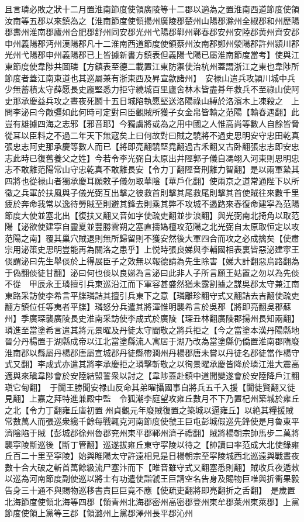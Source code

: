 且言璘必敗之狀十二月置淮南節度使領廣陵等十二郡以適為之置淮南西道節度使領汝南等五郡以來鎮為之【淮南節度使領揚州廣陵郡楚州山陽郡滁州全椒郡和州歷陽郡夀州淮南郡廬州合肥郡舒州同安郡光州弋陽郡鄿州鄿春郡安州安陸郡黄州齊安郡申州義陽郡沔州漢陽郡凡十二淮南西道節度使領蔡州汝南郡鄭州滎陽郡許州潁川郡光州弋陽郡申州義陽郡已上皆據新書方鎮表但義陽弋陽已屬淮南節度當考】使與江東節度使韋陟共圖璘【方鎮表至德二載置江東防禦使治杭州蓋謂浙江之東也韋陟所節度者蓋江南東道也其巡屬兼有浙東西及昇宣歙諸州】　安禄山遣兵攻頴川城中兵少無蓄積太守薛愿長史龐堅悉力拒守繞城百里廬舍林木皆盡朞年救兵不至祿山使阿史那承慶益兵攻之晝夜死鬭十五日城陷執愿堅送洛陽祿山縛於洛濱木上凍殺之　上問李泌曰今敵彊如此何時可定對曰臣觀賊所獲子女金帛皆輸之范陽【輸舂遇翻】此豈有雄據四海之志邪【邪音耶】今獨虜將或為之用中國之人惟高尚等數人自餘皆脅從耳以臣料之不過二年天下無寇矣上曰何故對曰賊之驍將不過史思明安守忠田乾真張忠志阿史那承慶等數人而已【將即亮翻驍堅堯翻過古禾翻又古卧翻張忠志即安忠志此時已復舊養父之姓】今若令李光弼自太原出井陘郭子儀自馮翊入河東則思明忠志不敢離范陽常山守忠乾真不敢離長安【令力丁翻陘音刑離力智翻】是以兩軍縶其四將也從禄山者獨承慶耳願敕子儀勿取華陰【華戶化翻】使兩京之道常通陛下以所徵之兵軍於扶風與子儀光弼互出擊之彼救首則擊其尾救尾則擊其首使賊往來數千里疲於奔命我常以逸待勞賊至則避其鋒去則乘其弊不攻城不遏路來春復命建寜為范陽節度大使並塞北出【復扶又翻又音如字使疏吏翻並步浪翻】與光弼南北掎角以取范陽【泌欲使建寜自靈夏並豐勝雲朔之塞直擣媯檀攻范陽之北光弼自太原取恒定以攻范陽之南】覆其巢穴賊退則無所歸留則不獲安然後大軍四合而攻之必成擒矣【使肅宗用泌策史思明豈能再為關洛之患乎】上悦時張良娣與李輔國相表裏皆惡泌建寜王倓謂泌曰先生舉倓於上得展臣子之效無以報德請為先生除害【娣大計翻惡烏路翻為于偽翻倓徒甘翻】泌曰何也倓以良娣為言泌曰此非人子所言願王姑置之勿以為先倓不從　甲辰永王璘擅引兵東巡沿江而下軍容甚盛然猶未露割據之謀吳郡太守兼江南東路采訪使李希言平牒璘詰其擅引兵東下之意【璘離珍翻守式又翻詰去吉翻使疏吏翻方鎮位任等夷者平牒】璘怒分兵遣其將渾惟明襲希言於吳郡【將即亮翻吳郡蘇州】季廣琛襲廣陵長史淮南采訪使李成式於廣陵【琛丑林翻廣陵郡揚州長知兩翻】璘進至當塗希言遣其將元景曜及丹徒太守閻敬之將兵拒之【今之當塗本漢丹陽縣地晉分丹楊置于湖縣成帝以江北當塗縣流人寓居于湖乃改為當塗縣仍僑置淮南郡隋廢淮南郡以縣屬丹楊郡唐屬宣城郡丹徒縣帶潤州丹楊郡唐未嘗以丹徒名郡徒當作楊守式又翻】李成式亦遣其將李承慶拒之璘擊斬敬之以徇景曜承慶皆降於璘江淮大震高適與來瑱韋陟會於安陸結盟誓衆以討之【韋陟蓋赴鎮中道聞變遂會於安陸降戶江翻瑱它甸翻】　于闐王勝聞安禄山反命其弟曜攝國事自將兵五千入援【闐徒賢翻又徒見翻】上嘉之拜特進兼殿中監　令狐潮李庭望攻雍丘數月不下乃置杞州築城於雍丘之北【令力丁翻雍丘唐初置州貞觀元年廢賊復置之築城以逼雍丘】以絶其糧援賊常數萬人而張巡衆纔千餘每戰輒克河南節度使虢王巨屯彭城假巡先鋒使是月魯東平濟陰陷于賊【彭城郡徐州魯郡兖州東平郡鄆州濟子禮翻】賊將楊朝宗帥馬步二萬將襲寜陵斷巡後【斷丁管翻】巡遂拔雍丘東守寜陵以待之【帥讀曰率范成大北使錄雍丘百二十里至寜陵】始與睢陽太守許遠相見是日楊朝宗至寜陵城西北巡遠與戰晝夜數十合大破之斬首萬餘級流尸塞汴而下【睢音雖守式又翻塞悉則翻】賊收兵夜遁敕以巡為河南節度副使巡以將士有功遣使詣虢王巨請空名告身及賜物巨唯與折衝果毅告身三十通不與賜物巡移書責巨巨竟不應【使疏吏翻將即亮翻折之舌翻】　是歲置北海節度使領北海等四郡【領青州北海郡密州高密郡登州東牟郡萊州東萊郡】上黨節度使領上黨等三郡【領潞州上黨郡澤州長平郡沁州